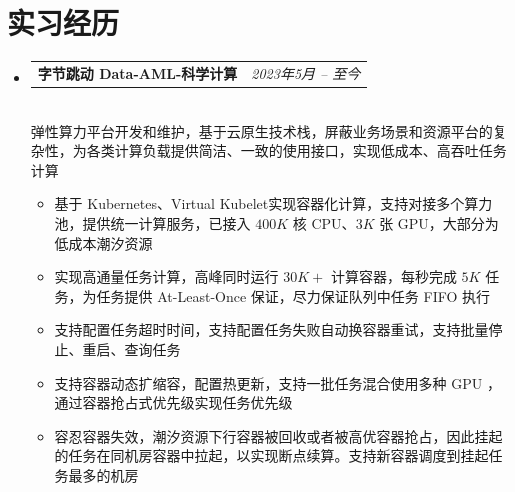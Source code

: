 \documentclass[letterpaper,11pt]{article}
\makeatletter
\newcommand{\resumeItem}[2]{
  \item\small{
    \textbf{#1}{ #2 \vspace{-2pt}}
  }
}
\newcommand{\resumeSubheadingtwo}[2]{
  \vspace{-1pt}\item
    \begin{tabular*}{0.97\textwidth}{l@{\extracolsep{\fill}}r}
      \textbf{#1} & \textit{ #2} \\
    \end{tabular*}\vspace{-5pt}
}
\newcommand{\resumeItemListStart}{\vspace{-10pt}\begin{itemize}}
\newcommand{\resumeItemListEnd}{\end{itemize}\vspace{-10pt}}
\makeatother
\begin{document}
\section{实习经历}
    \begin{itemize}[leftmargin=*,itemsep=-10pt]
        \resumeSubheadingtwo
            {字节跳动 Data-AML-科学计算}{2023年5月 -- 至今}
            \\[10pt]
            弹性算力平台开发和维护，基于云原生技术栈，屏蔽业务场景和资源平台的复杂性，为各类计算负载提供简洁、一致的使用接口，实现低成本、高吞吐任务计算
            \resumeItemListStart
                 \resumeItem{}
                {基于 Kubernetes、Virtual Kubelet实现容器化计算，支持对接多个算力池，提供统一计算服务，已接入 $400K$ 核 CPU、$3K$ 张 GPU，大部分为低成本潮汐资源}
                \resumeItem{}
                {实现高通量任务计算，高峰同时运行 $30K+$ 计算容器，每秒完成 $5K$ 任务，为任务提供 At-Least-Once 保证，尽力保证队列中任务 FIFO 执行}
                \resumeItem{}
                {支持配置任务超时时间，支持配置任务失败自动换容器重试，支持批量停止、重启、查询任务}
                \resumeItem{}
                {支持容器动态扩缩容，配置热更新，支持一批任务混合使用多种 GPU ，通过容器抢占式优先级实现任务优先级}
                \resumeItem{}
                {容忍容器失效，潮汐资源下行容器被回收或者被高优容器抢占，因此挂起的任务在同机房容器中拉起，以实现断点续算。支持新容器调度到挂起任务最多的机房}
            \resumeItemListEnd
    \end{itemize}

\vspace{-10pt}
\end{document}
